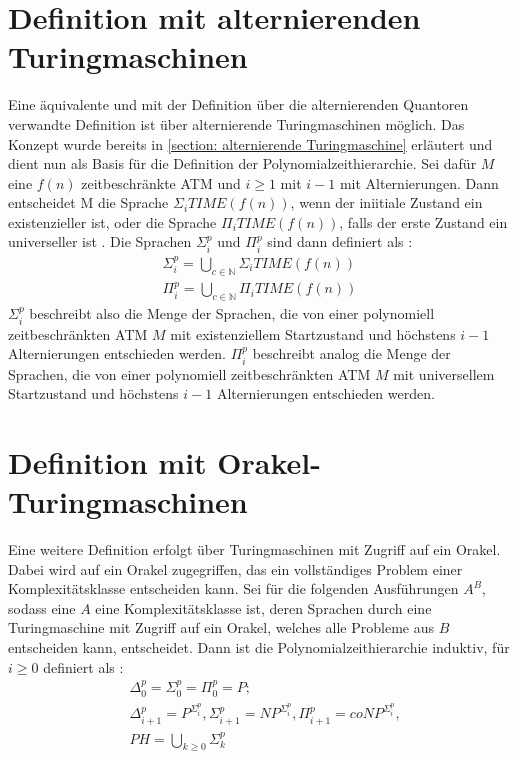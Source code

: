 \section{Definition mit alternierenden Turingmaschinen} \label{section: Definition PH mit ATM}
Eine äquivalente und mit der Definition über die alternierenden Quantoren verwandte Definition ist über alternierende Turingmaschinen möglich.
Das Konzept wurde bereits in \ref{section: alternierende Turingmaschine} erläutert und dient nun als Basis für die Definition der Polynomialzeithierarchie.
Sei dafür $M$ eine $f(n)$ zeitbeschränkte ATM und $i \geq 1$  mit $i - 1$ mit  Alternierungen. Dann entscheidet M die Sprache $\Sigma_i TIME(f(n))$, wenn der iniitiale Zustand ein existenzieller ist,
oder die Sprache $\Pi_i TIME(f(n))$, falls der erste Zustand ein universeller ist \cite{arora_computational_2009}.
Die Sprachen $\Sigma^p_i$ und $\Pi^p_i$ sind dann definiert als \cite{arora_computational_2009}:
\begin{align*}
    \Sigma^p_i = \bigcup_{c \in \mathbb{N}} \Sigma_i TIME(f(n)) \\
    \Pi^p_i = \bigcup_{c \in \mathbb{N}} \Pi_i TIME(f(n))
\end{align*}
$\Sigma^p_i$ beschreibt also die Menge der Sprachen, die von einer polynomiell zeitbeschränkten ATM $M$ mit existenziellem Startzustand und höchstens $i-1$ Alternierungen entschieden werden.
$\Pi^p_i$ beschreibt analog die Menge der Sprachen, die von einer polynomiell zeitbeschränkten ATM $M$ mit universellem Startzustand und höchstens $i-1$ Alternierungen entschieden werden.
\section{Definition mit Orakel-Turingmaschinen} \label{section: Definition PH mit Orakel-Turingmaschinen}
Eine weitere Definition erfolgt über Turingmaschinen mit Zugriff auf ein Orakel. Dabei wird auf ein Orakel zugegriffen,
das ein vollständiges Problem einer Komplexitätsklasse entscheiden kann. Sei für die folgenden Ausführungen $A^B$, sodass eine $A$ eine Komplexitätsklasse ist, deren Sprachen durch eine Turingmaschine mit Zugriff auf ein Orakel, welches alle Probleme aus $B$ entscheiden kann, entscheidet. 
Dann ist die Polynomialzeithierarchie induktiv, für $i \geq 0$ definiert als \cite{rothe_komplexitatstheorie_2008}:
\begin{align*}
    & \Delta^p_0 = \Sigma^p_0 = \Pi^p_0 = P; \\
    & \Delta^p_{i+1} = P^{\Sigma^p_i}, \Sigma^p_{i+1} = NP^{\Sigma^p_i}, \Pi^p_{i+1} = coNP^{\Sigma^p_i}, \\
    & PH = \bigcup_{k \geq 0} \Sigma^p_k
\end{align*}
